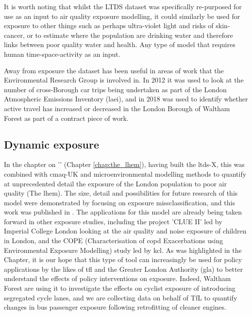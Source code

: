 It is worth noting that whilst the LTDS dataset was specifically re-purposed for use as an input to air quality exposure modelling, it could similarly be used for exposure to other things such as perhaps ultra-violet light and risks of skin-cancer, or to estimate where the population are drinking water and therefore links between poor quality water and health. Any type of model that requires human time-space-activity as an input.

Away from exposure the dataset has been useful in areas of work that the Environmental Research Group is involved in. In 2012 it was used to look at the number of cross-Borough car trips being undertaken as part of the London Atmospheric Emissions Inventory (\gls{laei}), and in 2018 was used to identify whether active travel has increased or decreased in the London Borough of Waltham Forest as part of a contract piece of work.\\ 

\subsection{Dynamic exposure}
\label{dynamic_exposure_wrapup}

In the chapter on '' (Chapter \ref{chap:the_lhem}), having built the \gls{ltds}-X, this was combined with \gls{cmaq}-UK and microenvironmental modelling methods to quantify at unprecedented detail the exposure of the London population to poor air quality (The \gls{lhem}). The size, detail and possibilities for future research of this model were demonstrated by focusing on exposure missclassification, and this work was published in \cite{Smith2016}. The applications for this model are already being taken forward in other exposure studies, including the project 'CLUE II' led by Imperial College London looking at the air quality and noise exposure of children in London, and the COPE (Characterisation of \gls{copd} Exacerbations using Environmental Exposure Modelling) study led by \gls{kcl}. As was highlighted in the Chapter, it is our hope that this type of tool can increasingly be used for policy applications by the likes of \gls{tfl} and the Greater London Authority (\gls{gla}) to better understand the effects of policy interventions on exposure. Indeed, Waltham Forest are using it to investigate the effects on cyclist exposure of introducing segregated cycle lanes, and we are collecting data on behalf of TfL to quantify changes in bus passenger exposure following retrofitting of cleaner engines.

